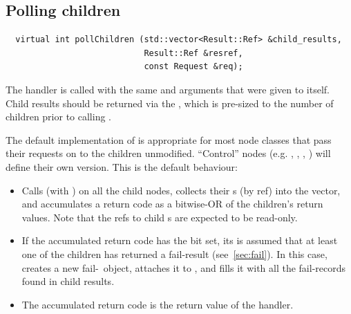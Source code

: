 \subsection{Polling children}
    

  \begin{verbatim}    
  virtual int pollChildren (std::vector<Result::Ref> &child_results,
                            Result::Ref &resref,
                            const Request &req);
  \end{verbatim}
    
  \noindent The handler is called with the same  and 
  arguments that were given to  itself. Child results should be
  returned via the , which is pre-sized to the number of
  children prior to calling .

  The default implementation of  is appropriate for most
  node classes that pass their requests on to the children unmodified. 
  ``Control'' nodes (e.g. , , , ) will
  define their own version. This is the default 
  behaviour:

  \begin{itemize}

  \item Calls  (with ) on all the child nodes, collects
  their \Result{}s (by ref) into the  vector, and
  accumulates a return code as a bitwise-OR of the children's 
  return values. Note that the refs to child \Result{}s are expected to
  be read-only. 

  \item If the accumulated return code has the  bit set, its is
  assumed that at least one of the children has returned a fail-result
  (see~\ref{sec:fail}). In this case,  creates a new
  fail-\Result\ object, attaches it to , and fills it with 
  all the fail-records found in child results.

  \item The accumulated return code is the return value of the handler.

  \end{itemize}
  
